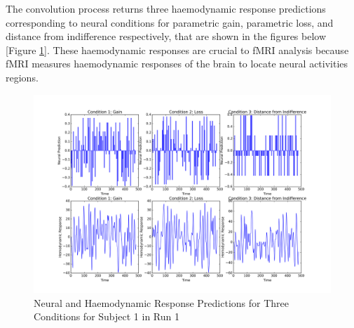 \par \indent The convolution process returns three haemodynamic response 
predictions corresponding to neural conditions for parametric gain, parametric 
loss, and distance from indifference respectively, that are shown in the 
figures below [Figure \ref{fig:convolution}]. These haemodynamic responses are 
crucial to fMRI analysis because fMRI measures haemodynamic responses of the 
brain to locate neural activities regions. 

\begin{figure}[h!]
\centering
\includegraphics[width=120mm]{images/convolution3cond.png}
\caption{Neural and Haemodynamic Response Predictions for Three Conditions for
         Subject 1 in Run 1}
\label{fig:convolution}
\end{figure}
